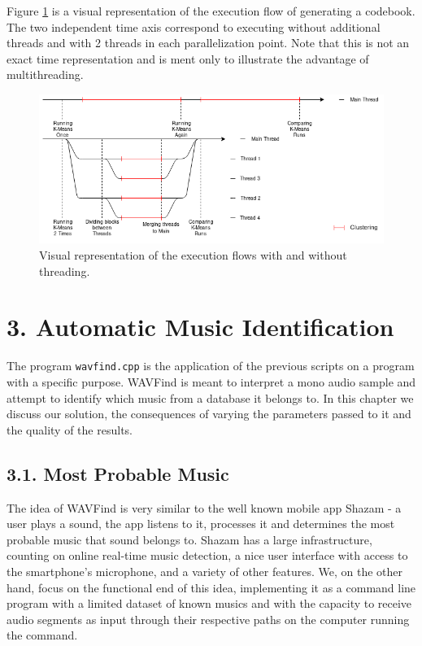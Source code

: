 \documentclass[12pt]{article}
\begin{document}
Figure \ref{fig:threading} is a visual representation of the execution flow of 
generating a codebook. 
The two independent time axis correspond to executing without additional threads 
and with 2 threads in each parallelization point.
Note that this is not an exact time representation and is ment only to illustrate
the advantage of multithreading. 

\begin{figure}[H]
  \centering
  \begin{minipage}{\textwidth}
    \centering
    \includegraphics[width=0.95\linewidth]{threading.png}
  \end{minipage}%
  \caption{Visual representation of the execution flows with and without threading.}
  \label{fig:threading}
\end{figure}

\newpage
\section*{3. Automatic Music Identification}

The program \texttt{wavfind.cpp} is the application of the previous scripts on a 
program with a specific purpose.
WAVFind is meant to interpret a mono audio sample and attempt to identify which music 
from a database it belongs to.
In this chapter we discuss our solution, the consequences of varying the 
parameters passed to it and the quality of the results.

\subsection*{3.1. Most Probable Music}

The idea of WAVFind is very similar to the well known mobile app Shazam 
\cite{shazam} - a user plays a sound, the app listens to it, processes it and
determines the most probable music that sound belongs to.
Shazam has a large infrastructure, counting on online real-time music detection,
a nice user interface with access to the smartphone's microphone, and a variety
of other features.
We, on the other hand, focus on the functional end of this idea, implementing
it as a command line program with a limited dataset of known musics and with
the capacity to receive audio segments as input through their respective paths 
on the computer running the command.
\end{document}

